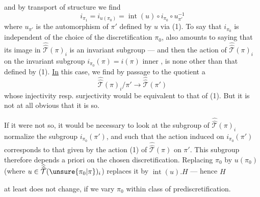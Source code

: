 

and by transport of structure we find
\[
i_{\pi_1}=i_{u(\pi_0)}=\operatorname{int}(u)\circ i_{\pi_0}\circ u_{\pi'}^{-1}
\]
where $u_{\pi'}$ is the automorphism of $\pi'$ defined by $u$ via (1). To say that $i_{\pi_0}$ is independent of the choice of the discretification $\pi_0$, also amounts to saying that its image in $\widehat{\widehat{\mathcal T}}(\pi)_i$ is an invariant subgroup --- and then the action of $\widehat{\widehat{\mathcal T}}(\pi)_i$ on \deleted{\unsure{$\pi$}} the invariant subgroup $i_{\pi_0}(\pi)=i(\pi)$   inner , is none other than that defined by (1). \uline{In} this case, we find by passage to the quotient a 
\[
\tag{6}
\widehat{\widehat{\mathcal T}}(\pi)_i/\pi'\longrightarrow\widehat{\widehat{\mathcal T}}(\pi')
\]
whose injectivity resp. surjectivity would be equivalent to that of (1). But it is not at all obvious that it is  so.

If it were not so, it  would be necessary to look at the subgroup of $\widehat{\widehat{\mathcal T}}(\pi)_i$   normalize the  subgroup $i_{\pi_0}(\pi')$, and such that the action induced on $i_{\pi_0}(\pi')$ corresponds to that given by the action (1) of $\widehat{\widehat{\mathcal T}}(\pi)$ on $\pi'$. This subgroup  therefore depends a priori on the chosen discretification. Replacing $\pi_0$ by $u(\pi_0)$ (where  $u\in\widehat{\widehat{\mathcal T}}(\unsure{\pi_0|\pi})_i$) replaces it by $\operatorname{int}(u).H$ --- hence $H$



at least does not change, if we vary $\pi_0$ within  class of prediscretification.

